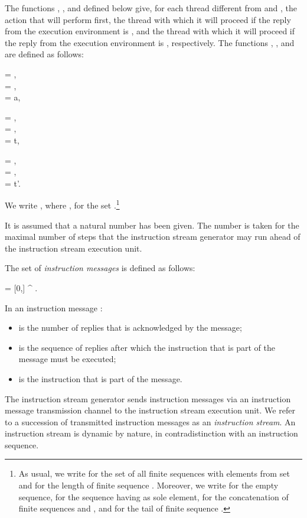 \documentclass[fleqn]{llncs}
\begin{document}
The functions , , and  defined below
give, for each thread  different from  and , the
action that  will perform first, the thread with which it will
proceed if the reply from the execution environment is , and the
thread with which it will proceed if the reply from the execution
environment is , respectively.
The functions ,
, and  are
defined as follows:
\begin{ldispl}
\begin{geqns}
\act{\Stop} = \stopd\;,
\\
\act{\DeadEnd} = \deadd\;,
\\
 = a\;,
\end{geqns}
\quad
\begin{geqns}
\rest{\Stop} = \DeadEnd\;,
\\
\rest{\DeadEnd} = \DeadEnd\;,
\\
 = t\;,
\end{geqns}
\quad
\begin{geqns}
\resf{\Stop} = \DeadEnd\;,
\\
\resf{\DeadEnd} = \DeadEnd\;,
\\
 = t'\;.
\end{geqns}
\end{ldispl}

We write , where , for the set
.\footnote
{As usual, we write  for the set of all finite sequences
 with elements from set  and  for the length of finite
 sequence .
 Moreover, we write  for the empty sequence,  for the
 sequence having  as sole element,  for the
 concatenation of finite sequences  and , and
  for the tail of finite sequence .
}

It is assumed that a natural number  has been given.
The number  is taken for the maximal number of steps that the
instruction stream generator may run ahead of the instruction stream
execution unit.

The set  of \emph{instruction messages} is defined as follows:
\begin{ldispl}
\Msg = [0,\maxlen] \x \Bool^{\leq \maxlen} \x \BActi\;.
\end{ldispl}
In an instruction message :
\begin{itemize}
\item
 is the number of replies that is acknowledged by the message;
\item
 is the sequence of replies after which the instruction that is part
of the message must be executed;
\item
 is the instruction that is part of the message.
\end{itemize}
The instruction stream generator sends instruction messages via an
instruction message transmission channel to the instruction stream
execution unit.
We refer to a succession of transmitted instruction messages as an
\emph{instruction stream}.
An instruction stream is dynamic by nature, in contradistinction with an
instruction sequence.
\end{document}
